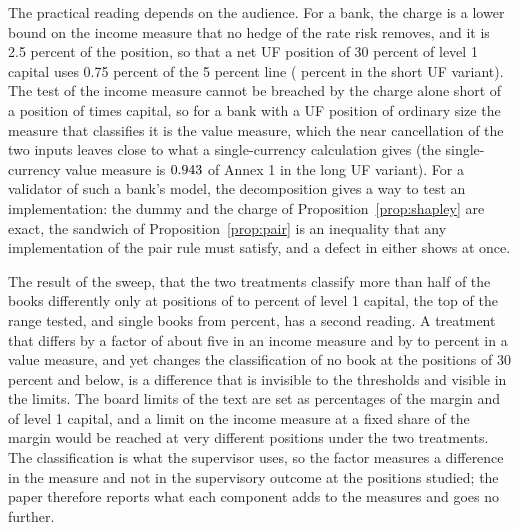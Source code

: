The practical reading depends on the audience. For a bank, the charge is a lower bound on the income measure that no hedge of the rate risk removes, and it is 2.5 percent of the position, so that a net UF position of 30 percent of level 1 capital uses 0.75 percent of the 5 percent line (\repChargeOverTier{} percent in the short UF variant). The test of the income measure cannot be breached by the charge alone short of a position of \floorBreakNu{} times capital, so for a bank with a UF position of ordinary size the measure that classifies it is the value measure, which the near cancellation of the two inputs leaves close to what a single-currency calculation gives (the single-currency value measure is $0.943$ of Annex 1 in the long UF variant). For a validator of such a bank's model, the decomposition gives a way to test an implementation: the dummy and the charge of Proposition~\ref{prop:shapley} are exact, the sandwich of Proposition~\ref{prop:pair} is an inequality that any implementation of the pair rule must satisfy, and a defect in either shows at once.

The result of the sweep, that the two treatments classify more than half of the books differently only at positions of \sweepMajLo{} to \sweepMajHi{} percent of level 1 capital, the top of the range tested, and single books from \sweepFirstDiff{} percent, has a second reading. A treatment that differs by a factor of about five in an income measure and by \mainEveShortLo{} to \mainEveShortHi{} percent in a value measure, and yet changes the classification of no book at the positions of 30 percent and below, is a difference that is invisible to the thresholds and visible in the limits. The board limits of the text are set as percentages of the margin and of level 1 capital, and a limit on the income measure at a fixed share of the margin would be reached at very different positions under the two treatments. The classification is what the supervisor uses, so the factor measures a difference in the measure and not in the supervisory outcome at the positions studied; the paper therefore reports what each component adds to the measures and goes no further.
